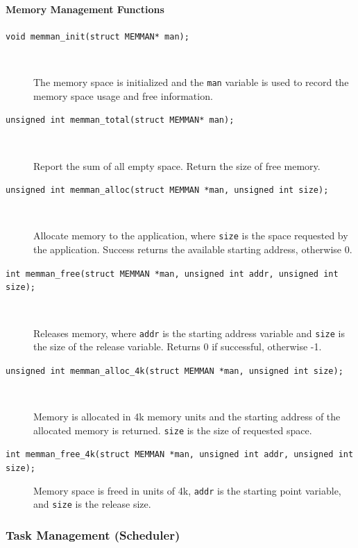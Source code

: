 \documentclass{swfcthesis}
\begin{document}
\paragraph{Memory Management Functions}

\begin{description}
\item[\texttt{void memman_init(struct MEMMAN* man);}]\ \par The memory space is
  initialized and the \texttt{man} variable is used to record the memory space usage and
  free information.
\item[\texttt{unsigned int memman_total(struct MEMMAN* man);}]\ \par Report the sum
  of all empty space. Return the size of free memory.
\item[\texttt{unsigned int memman_alloc(struct MEMMAN *man, unsigned int
    size);}]\ \par
  Allocate memory to the application, where \texttt{size} is the space requested by the
  application. Success returns the available starting address, otherwise 0.
\item[\texttt{int memman_free(struct MEMMAN *man, unsigned int addr, unsigned int
    size);}]\ \par
  Releases memory, where \texttt{addr} is the starting address variable and \texttt{size}
  is the size of the release variable. Returns 0 if successful, otherwise -1.
\item[\texttt{unsigned int memman_alloc_4k(struct MEMMAN *man, unsigned int
    size);}]\ \par Memory is allocated in 4k memory units and the starting address of the
  allocated memory is returned. \texttt{size} is the size of requested space.
\item[\texttt{int memman_free_4k(struct MEMMAN *man, unsigned int addr, unsigned
    int size);}] Memory space is freed in units of 4k, \texttt{addr} is the starting
  point variable, and \texttt{size} is the release size.
\end{description}

\subsubsection{Task Management (Scheduler)}
\label{sec:task-management}
\end{document}
